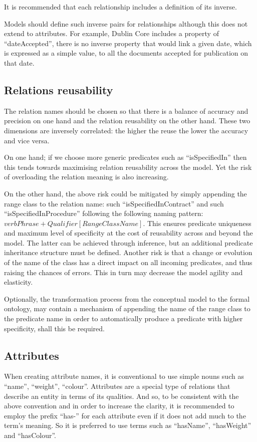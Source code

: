 	It is recommended that each relationship includes a definition of its inverse. 
	
	Models should define such inverse pairs for relationships although this does not extend to attributes. For example, Dublin Core\citep{dublin-core-metadata} includes a property of ``dateAccepted'', there is no inverse property that would link a given date, which is expressed as a simple value, to all the documents accepted for publication on that date.
	
	\subsection{Relations reusability}	
	\label{sec:relation-reusability}
	
	The relation names should be chosen so that there is a balance of accuracy and precision on one hand and the relation reusability on the other hand. These two dimensions are inversely correlated: the higher the reuse the lower the accuracy and vice versa. 
	
	On one hand; if we choose more generic predicates such as ``isSpecifiedIn'' then this tends towards maximising relation reusability across the model. Yet the risk of overloading the relation meaning is also increasing. 
	
	On the other hand, the above risk could be mitigated by simply appending the range class to the relation name: such ``isSpecifiedInContract'' and such ``isSpecifiedInProcedure'' following the following naming pattern: $verbPhrase + Qualifier[RangeClassName]$. This ensures predicate uniqueness and maximum level of specificity at the cost of reusability across and beyond the model. The latter can be achieved through inference, but an additional predicate inheritance structure must be defined.  Another risk is that a change or evolution of the name of the class has a direct impact on all incoming predicates, and thus raising the chances of errors. This in turn may decrease the model agility and elasticity.
	
	Optionally, the transformation process from the conceptual model to the formal ontology, may contain a mechanism of appending the name of the range class to the predicate name in order to automatically produce a predicate with higher specificity, shall this be required. 
	
	\subsection{Attributes}
	\label{sec:attributes}
	When creating attribute names, it is conventional to use simple nouns such as ``name'', ``weight'', ``colour''. Attributes are a special type of relations that describe an entity in terms of its qualities. And so, to be consistent with the above convention and in order to increase the clarity, it is recommended to employ the prefix ``has-'' for each attribute even if it does not add much to the term’s meaning. So it is preferred to use terms such as ``hasName'', ``hasWeight'' and ``hasColour''.
	
